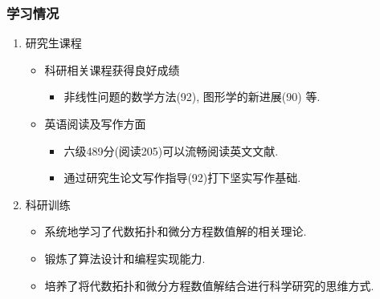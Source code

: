 \documentclass[UTF8]{ctexbeamer}	%
\theoremstyle{plain}
\theoremstyle{definition}
\theoremstyle{remark}
\numberwithin{equation}{section}
\begin{document}
\begin{frame}[fragile]
    \frametitle{学习情况}
    \begin{enumerate}
        \item 研究生课程
              \begin{itemize}
                  \item 科研相关课程获得良好成绩
                        \begin{itemize}
                            \item 非线性问题的数学方法(92), 图形学的新进展(90) 等.
                        \end{itemize}
                  \item 英语阅读及写作方面
                        \begin{itemize}
                            \item 六级489分(阅读205)可以流畅阅读英文文献.
                            \item 通过研究生论文写作指导(92)打下坚实写作基础.
                        \end{itemize}
              \end{itemize}
        \item 科研训练
              \begin{itemize}
                  \item 系统地学习了代数拓扑和微分方程数值解的相关理论.
                  \item 锻炼了算法设计和编程实现能力.
                  \item 培养了将代数拓扑和微分方程数值解结合进行科学研究的思维方式.
              \end{itemize}
    \end{enumerate}
\end{frame}
\end{document}
